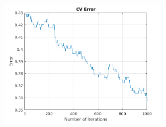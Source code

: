 \documentclass[12pt]{article}
\begin{document}
\begin{itemize}
         \begin{figure}[H]
        \begin{center}
          \includegraphics[width=0.75\textwidth]{images/Ex2c.png}
         \end{center}
        \end{figure}      
\end{itemize}
\end{document}
